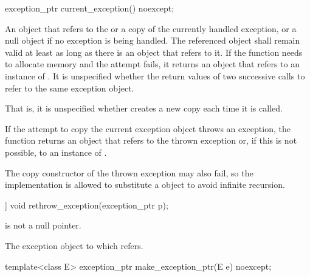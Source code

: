 %
\begin{itemdecl}
exception_ptr current_exception() noexcept;
\end{itemdecl}

\begin{itemdescr}
\pnum
\returns
An  object that refers to the
or a copy of the currently
handled exception, or a null  object if no exception is being
handled. The referenced object shall remain valid at least as long as there is an
 object that refers to it.
If the function needs to allocate memory and the attempt fails, it returns an
 object that refers to an instance of .
It is unspecified whether the return values of two successive calls to
 refer to the same exception object.
\begin{note}
That is, it is unspecified whether 
creates a new copy each time it is called.
\end{note}
If the attempt to copy the current exception object throws an exception, the function
returns an  object that refers to the thrown exception or,
if this is not possible, to an instance of .
\begin{note}
The
copy constructor of the thrown exception may also fail, so the implementation is allowed
to substitute a  object to avoid infinite
recursion.
\end{note}
\end{itemdescr}

%
\begin{itemdecl}
[[noreturn]] void rethrow_exception(exception_ptr p);
\end{itemdecl}

\begin{itemdescr}
\pnum
\expects
{} is not a null pointer.

\pnum
\throws
The exception object to which  refers.
\end{itemdescr}

%
\begin{itemdecl}
template<class E> exception_ptr make_exception_ptr(E e) noexcept;
\end{itemdecl}

